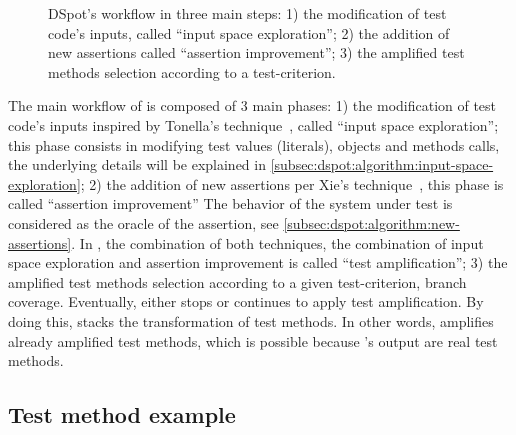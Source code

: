 \begin{figure}[h]
	\centering{}
	\caption{DSpot's workflow in three main steps: 
		1) the modification of test code's inputs, called ``input space exploration''; 
		2) the addition of new assertions called ``assertion improvement''; 
		3) the amplified test methods selection according to a test-criterion.
	}
	\label{fig:dspot-workflow}
\end{figure}

The main workflow of \dspot is composed of 3 main phases:
1) the modification of test code's inputs inspired by Tonella's technique~\cite{tonella}, called ``input space exploration''; 
this phase consists in modifying test values (\eg literals), objects and methods calls, the underlying details will be explained in \autoref{subsec:dspot:algorithm:input-space-exploration};
2) the addition of new assertions per Xie's technique~\cite{TaoXie2006}, this phase is called ``assertion improvement''
The behavior of the system under test is considered as the oracle of the assertion, see \autoref{subsec:dspot:algorithm:new-assertions}.
In \dspot, the combination of both techniques, \ie the combination of input space exploration and assertion improvement is called ``test amplification'';
3) the amplified test methods selection according to a given test-criterion, \eg branch coverage.
Eventually, \dspot either stops or continues to apply test amplification.
By doing this, \dspot stacks the transformation of test methods.
In other words, \dspot amplifies already amplified test methods, which is possible because \dspot's output are real test methods.

\subsection{Test method example}
\label{subsec:dspot:overview:appliance-to-unit-test}

